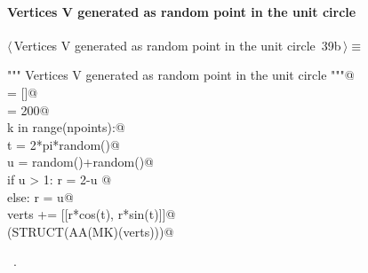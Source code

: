 \documentclass[11pt,oneside]{article}	%
\begin{document}
\paragraph{Vertices V generated as random point in the unit circle}
\begin{flushleft} \small \label{scrap61}
\protect{}$\langle\,$Vertices V generated as random point in the unit circle\nobreak\ {\footnotesize 39b}$\,\rangle\equiv$
\vspace{-1ex}
\begin{list}{}{} \item
\mbox{}\verb@""" Vertices V generated as random point in the unit circle """@\\
\mbox{}\verb@verts = []@\\
\mbox{}\verb@npoints = 200@\\
\mbox{}\verb@for k in range(npoints):@\\
\mbox{}\verb@   t = 2*pi*random()@\\
\mbox{}\verb@   u = random()+random()@\\
\mbox{}\verb@   if u > 1: r = 2-u @\\
\mbox{}\verb@   else: r = u@\\
\mbox{}\verb@   verts += [[r*cos(t), r*sin(t)]]@\\
\mbox{}\verb@VIEW(STRUCT(AA(MK)(verts)))@\\
\mbox{}\verb@@{\NWsep}
\end{list}
\vspace{-1ex}
\footnotesize\addtolength{\baselineskip}{-1ex}
\begin{list}{}{\setlength{\itemsep}{-\parsep}\setlength{\itemindent}{-\leftmargin}}
\item \NWtxtMacroRefIn\ .
\end{list}
\end{flushleft}
\end{document}
